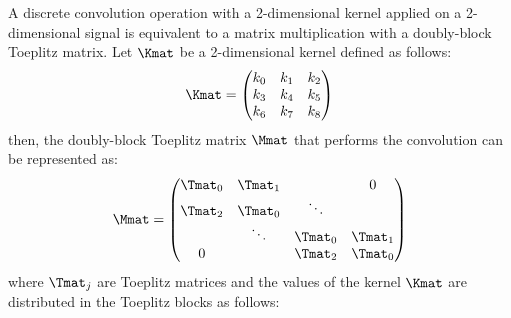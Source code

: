
A discrete convolution operation with a 2-dimensional kernel applied on a 2-dimensional signal is equivalent to a matrix multiplication with a doubly-block Toeplitz matrix.
Let $\Kmat$ be a 2-dimensional kernel defined as follows:
\begin{equation*}
  \Kmat = \leftmatrix
    k_0 & k_1 & k_2 \\
    k_3 & k_4 & k_5 \\
    k_6 & k_7 & k_8 
  \rightmatrix
\end{equation*}
then, the doubly-block Toeplitz matrix $\Mmat$ that performs the convolution can be represented as:
\begin{equation*}
  \Mmat = \leftmatrix
    \Tmat_0 & \Tmat_1 &         &  0       \\
    \Tmat_2 & \Tmat_0 & \ddots  &          \\
            & \ddots  & \Tmat_0 & \Tmat_1  \\
    0       &         & \Tmat_2 &  \Tmat_0
  \rightmatrix
\end{equation*}
where $\Tmat_j$ are Toeplitz matrices and the values of the kernel $\Kmat$ are distributed in the Toeplitz blocks as follows:
